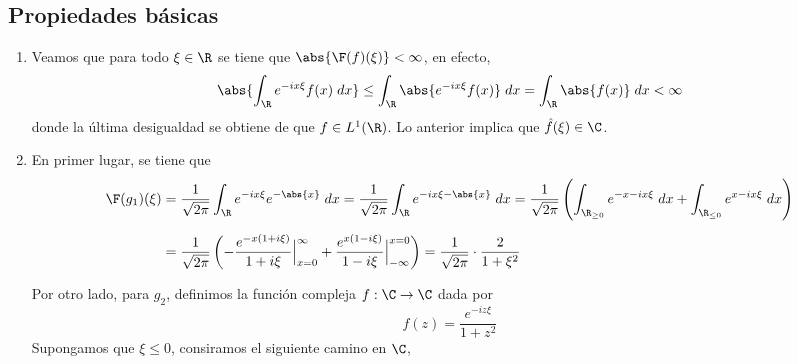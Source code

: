 \documentclass{article}
\begin{document}
\subsection{Propiedades básicas}
\begin{enumerate}
    \item Veamos que para todo $\xi\in\R$ se tiene que $\abs{\F(f)(\xi)}<\infty$, en efecto,
    \begin{equation*}
        \abs{\int_{\R}e^{-ix\xi}f(x)\hspace{1mm}dx}\leq\int_{\R}\abs{e^{-ix\xi}f(x)}\hspace{1mm}dx
        =\int_{\R}\abs{f(x)}\hspace{1mm}dx<\infty
    \end{equation*}
    donde la última desigualdad se obtiene de que $f\in L^{1}(\R)$. Lo anterior implica que 
    $\hat{f}(\xi)\in\C$.

    \item En primer lugar, se tiene que
    \begin{align*}
        \F(g_{1})(\xi) &= \frac{1}{\sqrt{2\pi}}\int_{\R}e^{-ix\xi}e^{-\abs{x}}\hspace{1mm}dx
        =\frac{1}{\sqrt{2\pi}}\int_{\R}e^{-ix\xi-\abs{x}}\hspace{1mm}dx
        =\frac{1}{\sqrt{2\pi}}\left(\int_{\R_{\geq0}}e^{-x-ix\xi}\hspace{1mm}dx
        +\int_{\R_{\leq0}}e^{x-ix\xi}\hspace{1mm}dx\right) \\[2mm]
        &= \frac{1}{\sqrt{2\pi}}\left(-\frac{e^{-x(1+i\xi)}}{1+i\xi}\Big|_{x=0}^{\infty}
        +\frac{e^{x(1-i\xi)}}{1-i\xi}\Big|_{-\infty}^{x=0}\right)
        =\frac{1}{\sqrt{2\pi}}\cdot\frac{2}{1+\xi^{2}}
    \end{align*}

    \vspace{2mm}
    Por otro lado, para $g_{2}$, definimos la función compleja $f:\C\to\C$ dada por
    \begin{equation*}
        f(z)=\frac{e^{-iz\xi}}{1+z^{2}}
    \end{equation*}
    Supongamos que $\xi\leq0$, consiramos el siguiente camino en $\C$,
    \begin{center}
\end{center}
\end{enumerate}
\end{document}
